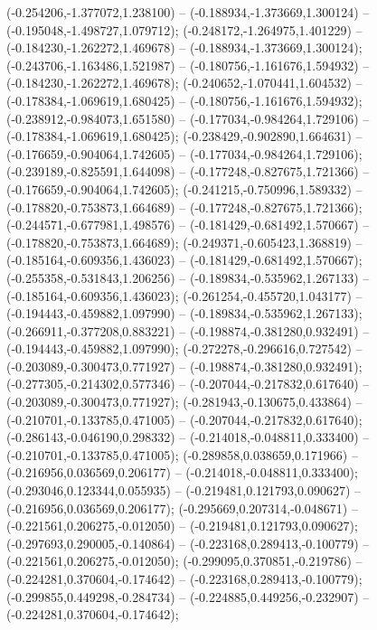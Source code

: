  (-0.254206,-1.377072,1.238100) -- (-0.188934,-1.373669,1.300124) -- (-0.195048,-1.498727,1.079712);
 (-0.248172,-1.264975,1.401229) -- (-0.184230,-1.262272,1.469678) -- (-0.188934,-1.373669,1.300124);
 (-0.243706,-1.163486,1.521987) -- (-0.180756,-1.161676,1.594932) -- (-0.184230,-1.262272,1.469678);
 (-0.240652,-1.070441,1.604532) -- (-0.178384,-1.069619,1.680425) -- (-0.180756,-1.161676,1.594932);
 (-0.238912,-0.984073,1.651580) -- (-0.177034,-0.984264,1.729106) -- (-0.178384,-1.069619,1.680425);
 (-0.238429,-0.902890,1.664631) -- (-0.176659,-0.904064,1.742605) -- (-0.177034,-0.984264,1.729106);
 (-0.239189,-0.825591,1.644098) -- (-0.177248,-0.827675,1.721366) -- (-0.176659,-0.904064,1.742605);
 (-0.241215,-0.750996,1.589332) -- (-0.178820,-0.753873,1.664689) -- (-0.177248,-0.827675,1.721366);
 (-0.244571,-0.677981,1.498576) -- (-0.181429,-0.681492,1.570667) -- (-0.178820,-0.753873,1.664689);
 (-0.249371,-0.605423,1.368819) -- (-0.185164,-0.609356,1.436023) -- (-0.181429,-0.681492,1.570667);
 (-0.255358,-0.531843,1.206256) -- (-0.189834,-0.535962,1.267133) -- (-0.185164,-0.609356,1.436023);
 (-0.261254,-0.455720,1.043177) -- (-0.194443,-0.459882,1.097990) -- (-0.189834,-0.535962,1.267133);
 (-0.266911,-0.377208,0.883221) -- (-0.198874,-0.381280,0.932491) -- (-0.194443,-0.459882,1.097990);
 (-0.272278,-0.296616,0.727542) -- (-0.203089,-0.300473,0.771927) -- (-0.198874,-0.381280,0.932491);
 (-0.277305,-0.214302,0.577346) -- (-0.207044,-0.217832,0.617640) -- (-0.203089,-0.300473,0.771927);
 (-0.281943,-0.130675,0.433864) -- (-0.210701,-0.133785,0.471005) -- (-0.207044,-0.217832,0.617640);
 (-0.286143,-0.046190,0.298332) -- (-0.214018,-0.048811,0.333400) -- (-0.210701,-0.133785,0.471005);
 (-0.289858,0.038659,0.171966) -- (-0.216956,0.036569,0.206177) -- (-0.214018,-0.048811,0.333400);
 (-0.293046,0.123344,0.055935) -- (-0.219481,0.121793,0.090627) -- (-0.216956,0.036569,0.206177);
 (-0.295669,0.207314,-0.048671) -- (-0.221561,0.206275,-0.012050) -- (-0.219481,0.121793,0.090627);
 (-0.297693,0.290005,-0.140864) -- (-0.223168,0.289413,-0.100779) -- (-0.221561,0.206275,-0.012050);
 (-0.299095,0.370851,-0.219786) -- (-0.224281,0.370604,-0.174642) -- (-0.223168,0.289413,-0.100779);
 (-0.299855,0.449298,-0.284734) -- (-0.224885,0.449256,-0.232907) -- (-0.224281,0.370604,-0.174642);
